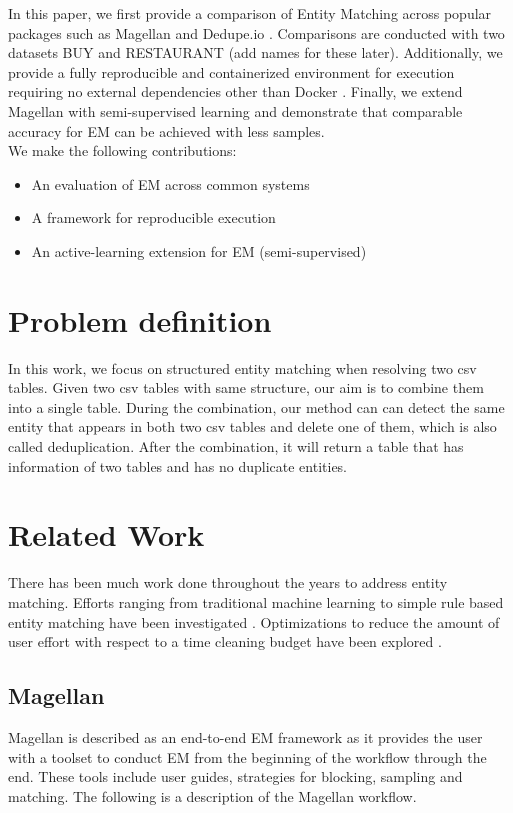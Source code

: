 \documentclass[letterpaper,twocolumn,10pt]{article}
\begin{document}

In this paper, we first provide a comparison of Entity Matching across popular packages such as Magellan and Dedupe.io \cite{bilenko2004learnable, konda2016magellan}. Comparisons are conducted with two datasets BUY and RESTAURANT (add names for these later). Additionally, we provide a fully reproducible and containerized environment for execution requiring no external dependencies other than Docker \cite{docker:2014}. Finally, we extend Magellan with semi-supervised learning and demonstrate that comparable accuracy for EM can be achieved with less samples. 
\\

We make the following contributions:
\begin{itemize}
  \item An evaluation of EM across common systems
  \item A framework for reproducible execution
  \item An active-learning extension for EM (semi-supervised)
\end{itemize}

\section{Problem definition}
In this work, we focus on structured entity matching when resolving two csv tables. Given two csv tables with same structure, our aim is to combine them into a single table. During the combination, our method can can detect the same entity that appears in both two csv tables and delete one of them, which is also called deduplication. After the combination, it will return a table that has information of two tables and has no duplicate entities.

\section{Related Work}
There has been much work done throughout the years to address entity matching. Efforts ranging from traditional machine learning to simple rule based entity matching have been investigated \cite{kopcke2010frameworks}. Optimizations to reduce the amount of user effort with respect to a time cleaning budget have been explored \cite{ao2019cleaningem}. 







\subsection{Magellan}
Magellan is described as an end-to-end EM framework as it provides the user with a toolset to conduct EM from the beginning of the workflow through the end. These tools include user guides, strategies for blocking, sampling and matching. The following is a description of the Magellan workflow.
\end{document}
